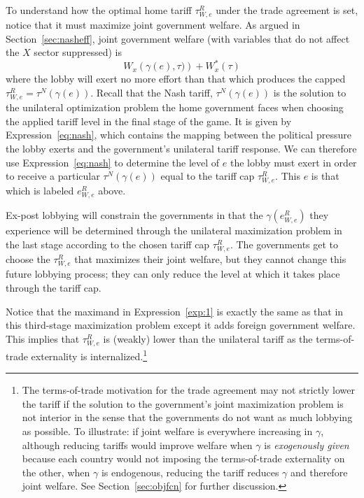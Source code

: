\documentclass[12pt]{article}
\newcommand{\ga}{\gamma}
\begin{document}
To understand how the optimal home tariff $\tau^R_{W,e}$ under the trade agreement is set, notice that it must maximize joint government welfare. As argued in Section~\ref{sec:nasheff}, joint government welfare (with variables that do not affect the $X$ sector suppressed) is
  \begin{equation}
		W_x \left(\ga(e),\tau) \right) + W_x^*\left(\tau \right)
	  \label{exp:1}
	\end{equation}
where the lobby will exert no more effort than that which produces the capped $\tau^R_{W,e}=\tau^N(\ga(e))$. Recall that the Nash tariff, $\tau^N(\ga(e))$ is the solution to the unilateral optimization problem the home government faces when choosing the applied tariff level in the final stage of the game. It is given by Expression~\ref{eq:nash}, which contains the mapping between the political pressure the lobby exerts and the government's unilateral tariff response. We can therefore use Expression~\ref{eq:nash} to determine the level of $e$ the lobby must exert in order to receive a particular $\tau^N(\ga(e))$ equal to the tariff cap $\tau^R_{W,e}$. This $e$ is that which is labeled $e^R_{W,e}$ above.

Ex-post lobbying will constrain the governments in that the $\ga\left(e^R_{W,e}\right)$ they experience will be determined through the unilateral maximization problem in the last stage according to the chosen tariff cap $\tau^R_{W,e}$. The governments get to choose the $\tau^R_{W,e}$ that maximizes their joint welfare, but they cannot change this future lobbying process; they can only reduce the level at which it takes place through the tariff cap.

Notice that the maximand in Expression~\ref{exp:1} is exactly the same as that in this third-stage maximization problem except it adds  foreign government welfare. This implies that $\tau^R_{W,e}$ is (weakly) lower than the unilateral tariff as the terms-of-trade externality is internalized.\footnote{The terms-of-trade motivation for the trade agreement may not strictly lower the tariff if the solution to the government's joint maximization problem is not interior in the sense that the governments do not want as much lobbying as possible. To illustrate: if joint welfare is everywhere increasing in $\ga$, although reducing tariffs would improve welfare when $\ga$ is \textit{exogenously given} because each country would not imposing the terms-of-trade externality on the other, when $\ga$ is endogenous, reducing the tariff reduces $\ga$ and therefore joint welfare. See Section~\ref{sec:objfcn} for further discussion.}
\end{document}
